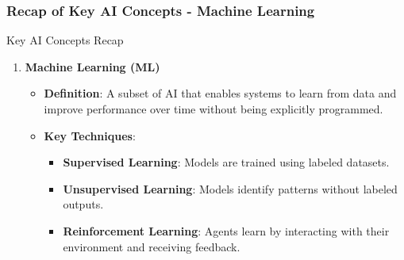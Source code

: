 \documentclass[aspectratio=169]{beamer}
\begin{document}
\begin{frame}[fragile]
    \frametitle{Recap of Key AI Concepts - Machine Learning}
    \begin{block}{Key AI Concepts Recap}
        \begin{enumerate}
            \item \textbf{Machine Learning (ML)}
                \begin{itemize}
                    \item \textbf{Definition}: A subset of AI that enables systems to learn from data and improve performance over time without being explicitly programmed.
                    \item \textbf{Key Techniques}:
                        \begin{itemize}
                            \item \textbf{Supervised Learning}: Models are trained using labeled datasets. 
                            \item \textbf{Unsupervised Learning}: Models identify patterns without labeled outputs.
                            \item \textbf{Reinforcement Learning}: Agents learn by interacting with their environment and receiving feedback.
                        \end{itemize}
                \end{itemize}
        \end{enumerate}
    \end{block}
\end{frame}
\end{document}
